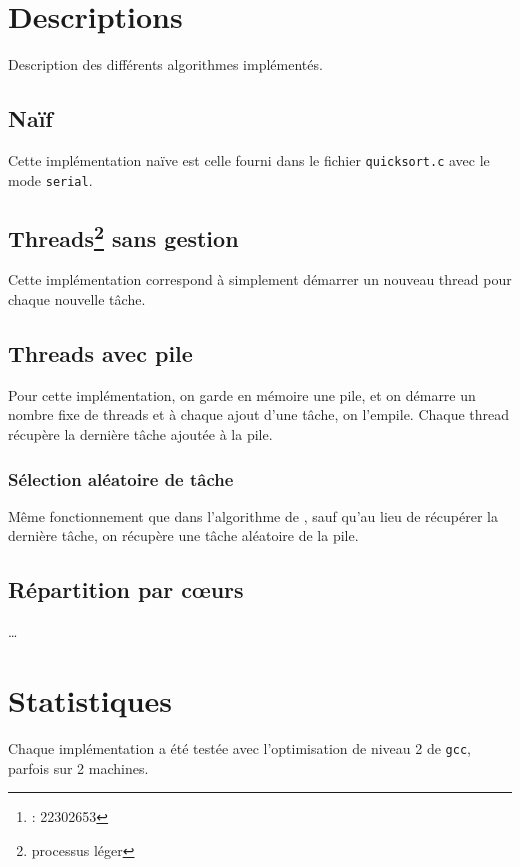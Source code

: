 \documentclass{article}
\title{\docTitle}
\author{\href{\authorMail}{\anri}\thanks{\anri : 22302653}}
\date{Année universitaire 2023-2024}
\newcommand{\docref}[1]{\textit{\nameref{#1}}} %
\def\coeurs{c\oe{}urs}
\begin{document}
\maketitle
\flushbottom
\tableofcontents
\clearpage

\section{Descriptions}
Description des différents algorithmes implémentés.

\subsection{Naïf}
Cette implémentation naïve est celle fourni dans le fichier
\texttt{quicksort.c} avec le mode \texttt{serial}.

\subsection[Threads sans gestion]{%
  Threads\footnote{processus léger} sans gestion}
Cette implémentation correspond à simplement démarrer un nouveau thread
pour chaque nouvelle tâche.

\subsection{Threads avec pile}\label{desc:th_pile}
Pour cette implémentation, on garde en mémoire une pile,
et on démarre un nombre fixe de threads et à chaque ajout d'une tâche,
on l'empile. Chaque thread récupère la dernière tâche ajoutée à la pile.

\subsubsection{Sélection aléatoire de tâche}
Même fonctionnement que dans l'algorithme de \docref{desc:th_pile}, sauf
qu'au lieu de récupérer la dernière tâche, on récupère une tâche
aléatoire de la pile.

\subsection{Répartition par \coeurs}
\dots

\section{Statistiques}
Chaque implémentation a été testée avec l'optimisation de niveau 2
de \texttt{gcc}, parfois sur 2 machines. %
\end{document}
